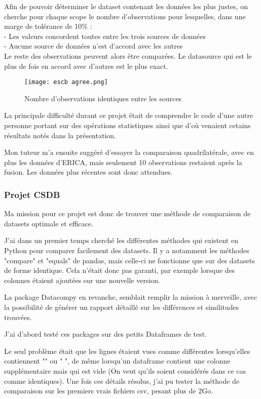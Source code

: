 Afin de pouvoir déterminer le dataset contenant les données les plus justes, on cherche pour chaque scope le nombre d'observations pour lesquelles, dans une marge de tolérance de 10\% : \\
- Les valeurs concordent toutes entre les trois sources de données \\
- Aucune source de données n'est d'accord avec les autres\\

Le reste des observations peuvent alors être comparées. Le datasource qui est le plus de fois en accord avec d'autres est le plus exact.
\begin{figure}[H]
    \centering
    \texttt{[image: escb agree.png]}
    \caption{Nombre d'observations identiques entre les sources}
\end{figure}

La principale difficulté durant ce projet était de comprendre le code d'une autre personne portant sur des opérations statistiques ainsi que d'où venaient cetains résultats notés dans la présentation.

Mon tuteur m'a ensuite suggéré d'essayer la comparaison quadrilatérale, avec en plus les données d'ERICA, mais seulement 10 observations restaient après la fusion. 
Les données plus récentes sont donc attendues.

\pagebreak

\subsubsection{Projet CSDB}

Ma mission pour ce projet est donc de trouver une méthode de comparaison de datasets optimale et efficace.

J'ai dans un premier temps cherché les différentes méthodes qui existent en Python pour comparer facilement des datasets.
Il y a notamment les méthodes "compare" et "equals" de pandas, mais celle-ci ne fonctionne que sur des datasets de forme identique.
Cela n'était donc pas garanti, par exemple lorsque des colonnes étaient ajoutées sur une nouvelle version.

La package Datacompy en revanche, semblait remplir la mission à merveille, avec la possibilité de générer un rapport détaillé sur les différences et similitudes trouvées.

J'ai d'abord testé ces packages sur des petits Dataframes de test.

Le seul problème était que les lignes étaient vues comme différentes lorsqu'elles contiennent "" ou " ", de même lorsqu'un dataframe contient une colonne supplémentaire mais qui est vide (On veut qu'ils soient considérés dans ce cas comme identiques).
Une fois ces détails résolus, j'ai pu tester la méthode de comparaison sur les premiers vrais fichiers csv, pesant plus de 2Go.
\\

